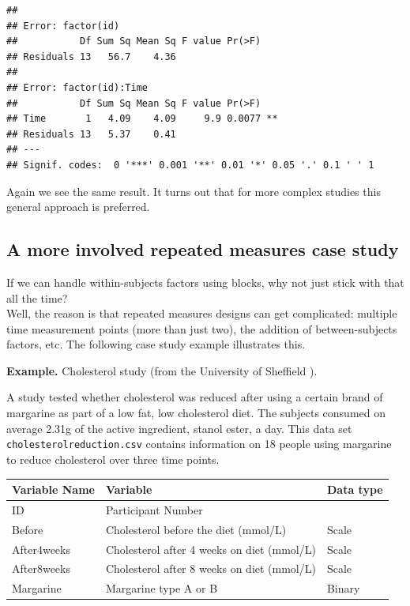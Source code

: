 \documentclass[
]{book}
\begin{document}
\begin{verbatim}
## 
## Error: factor(id)
##           Df Sum Sq Mean Sq F value Pr(>F)
## Residuals 13   56.7    4.36               
## 
## Error: factor(id):Time
##           Df Sum Sq Mean Sq F value Pr(>F)   
## Time       1   4.09    4.09     9.9 0.0077 **
## Residuals 13   5.37    0.41                  
## ---
## Signif. codes:  0 '***' 0.001 '**' 0.01 '*' 0.05 '.' 0.1 ' ' 1
\end{verbatim}

Again we see the same result. It turns out that for more complex studies this general approach is preferred.

\hypertarget{a-more-involved-repeated-measures-case-study}{%
\subsection{A more involved repeated measures case study}\label{a-more-involved-repeated-measures-case-study}}

If we can handle within-subjects factors using blocks, why not just stick with that all the time?\\
Well, the reason is that repeated measures designs can get complicated: multiple time measurement points (more than just two), the addition of between-subjects factors, etc.
The following case study example illustrates this.

\textbf{Example.} Cholesterol study (from the University of Sheffield \citep{sheffield2021}).

A study tested whether cholesterol was reduced after using a certain brand of margarine as part of a low fat, low cholesterol diet. The subjects consumed on average 2.31g of the active ingredient, stanol ester, a day. This data set \texttt{cholesterolreduction.csv} contains information on 18 people using margarine to reduce cholesterol over three time points.

\begin{tabular}{l|l|l}
\hline
Variable Name & Variable & Data type\\
\hline
ID & Participant Number & \\
\hline
Before & Cholesterol before the diet (mmol/L) & Scale\\
\hline
After4weeks & Cholesterol after 4 weeks on diet (mmol/L) & Scale\\
\hline
After8weeks & Cholesterol after 8 weeks on diet (mmol/L) & Scale\\
\hline
Margarine & Margarine type A or B & Binary\\
\hline
\end{tabular}
\end{document}
